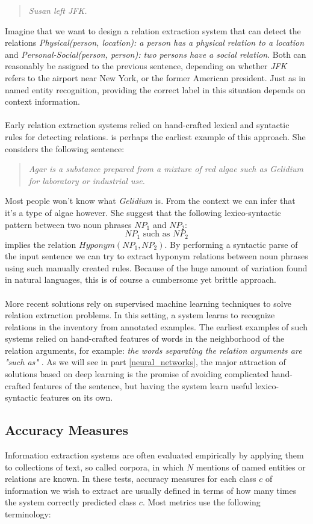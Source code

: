 \begin{quote}
	\textit{Susan left JFK.}
\end{quote}
Imagine that we want to design a relation extraction system that can detect the relations \textit{Physical(person, location): a person has a physical relation to a location} and \textit{Personal-Social(person, person): two persons have a social relation}. Both can reasonably be assigned to the previous sentence, depending on whether \textit{JFK} refers to the airport near New York, or the former American president. Just as in named entity recognition, providing the correct label in this situation depends on context information.
\\\\
Early relation extraction systems relied on hand-crafted lexical and syntactic rules for detecting relations. \citet{hearst1992} is perhaps the earliest example of this approach. She considers the following sentence:
\begin{quote}
	\textit{Agar is a substance prepared from a mixture of red algae such as Gelidium for laboratory or industrial use.}
\end{quote}
Most people won't know what \textit{Gelidium} is. From the context we can infer that it's a type of algae however. She suggest that the following lexico-syntactic pattern between two noun phrases $NP_1$ and $NP_2$:
$$
NP_1\text{ such as }NP_2
$$
implies the relation $Hyponym(NP_1, NP_2)$. By performing a syntactic parse of the input sentence we can try to extract hyponym relations between noun phrases using such manually created rules. Because of the huge amount of variation found in natural languages, this is of course a cumbersome yet brittle approach.
\\\\
More recent solutions rely on supervised machine learning techniques to solve relation extraction problems. In this setting, a system learns to recognize relations in the inventory from annotated examples. The earliest examples of such systems relied on hand-crafted features of words in the neighborhood of the relation arguments, for example: \textit{the words separating the relation arguments are "such as"} \citep{jurafsky09}. As we will see in part \ref{neural_networks}, the major attraction of solutions based on deep learning is the promise of avoiding complicated hand-crafted features of the sentence, but having the system learn useful lexico-syntactic features on its own.

\subsection{Accuracy Measures}
Information extraction systems are often evaluated empirically by applying them to collections of text, so called corpora, in which $N$ mentions of named entities or relations are known. In these tests, accuracy measures for each class $c$ of information we wish to extract are usually defined in terms of how many times the system correctly predicted class $c$. Most metrics use the following terminology:

